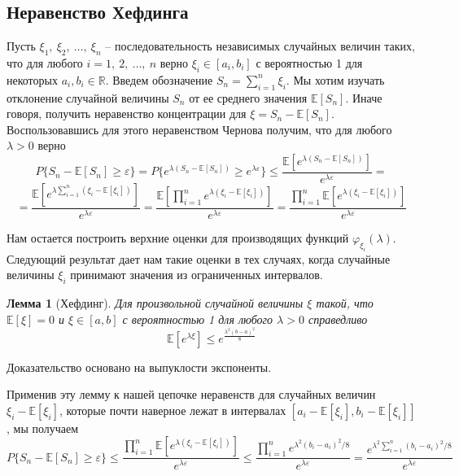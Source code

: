 \documentclass[a4paper]{article}
\newtheorem*{mlemma}{Лемма}
\begin{document}
\subsection{Неравенство Хефдинга}

Пусть $\xi_1,\ \xi_2,\ \dots,\ \xi_n$ -- последовательность независимых случайных величин таких, что 
для любого $i = 1,\ 2,\ \ldots,\ n$ верно $\xi_i \in [a_i, b_i]$ с вероятностью 1 для некоторых 
$a_i, b_i \in \mathbb{R}$. Введем обозначение $S_n = \sum\limits_{i = 1}^n\xi_i$. Мы хотим изучать 
отклонение случайной величины $S_n$ от ее среднего значения $\mathbb{E}[S_n]$. Иначе говоря, получить неравенство 
концентрации для $\xi = S_n - \mathbb{E}[S_n]$. Воспользовавшись для этого неравенством Чернова получим, что 
для любого $\lambda > 0$ верно $$P\{S_n - \mathbb{E}[S_n] \geq \varepsilon\} = P\{e^{\lambda(S_n - 
\mathbb{E}[S_n])} \geq e^{\lambda\varepsilon}\} \leq \frac{\mathbb{E}[e^{\lambda(S_n - \mathbb{E}[S_n])}]}{e^{\lambda\varepsilon}} = $$
$$ = \frac{\mathbb{E}[e^{\lambda\sum\limits_{i=1}^n(\xi_i - \mathbb{E}[\xi_i])}]}{e^{\lambda\varepsilon}} = 
\frac{\mathbb{E}[\prod\limits_{i=1}^ne^{\lambda(\xi_i - \mathbb{E}[\xi_i])}]}{e^{\lambda\varepsilon}} = 
\frac{\prod\limits_{i=1}^n\mathbb{E}[e^{\lambda(\xi_i - \mathbb{E}[\xi_i])}]}{e^{\lambda\varepsilon}}$$

Нам остается построить верхние оценки для производящих функций $\varphi_{\xi_i}(\lambda)$. Следующий 
результат дает нам такие оценки в тех случаях, когда случайные величины $\xi_i$ принимают значения 
из ограниченных интервалов.

\begin{mlemma}[Хефдинг]
    Для произвольной случайной величины $\xi$ такой, что $\mathbb{E}[\xi] = 0$ и $\xi \in [a, b]$ с вероятностью 1 
    для любого $\lambda > 0$ справедливо $$\mathbb{E}[e^{\lambda\xi}] \leq e^{\frac{\lambda^2(b-a)^2}{8}}$$
\end{mlemma}

Доказательство основано на выпуклости экспоненты.

Применив эту лемму к нашей цепочке неравенств для случайных величин $\xi_i - \mathbb{E}[\xi_i]$, которые
почти наверное лежат в интервалах $[a_i - \mathbb{E}[\xi_i], b_i - \mathbb{E}[\xi_i]]$, мы получаем 
$$P\{S_n - \mathbb{E}[S_n] \geq \varepsilon\} \leq \frac{\prod\limits_{i=1}^n\mathbb{E}[e^{\lambda(\xi_i - \mathbb{E}[\xi_i])}]}{e^{\lambda\varepsilon}} \leq 
 \frac{\prod\limits_{i=1}^ne^{\lambda^2(b_i-a_i)^2/8}}{e^{\lambda\varepsilon}} = \frac{e^{\lambda^2\sum\limits_{i=1}^n(b_i-a_i)^2/8}}{e^{\lambda\varepsilon}}$$
\end{document}
